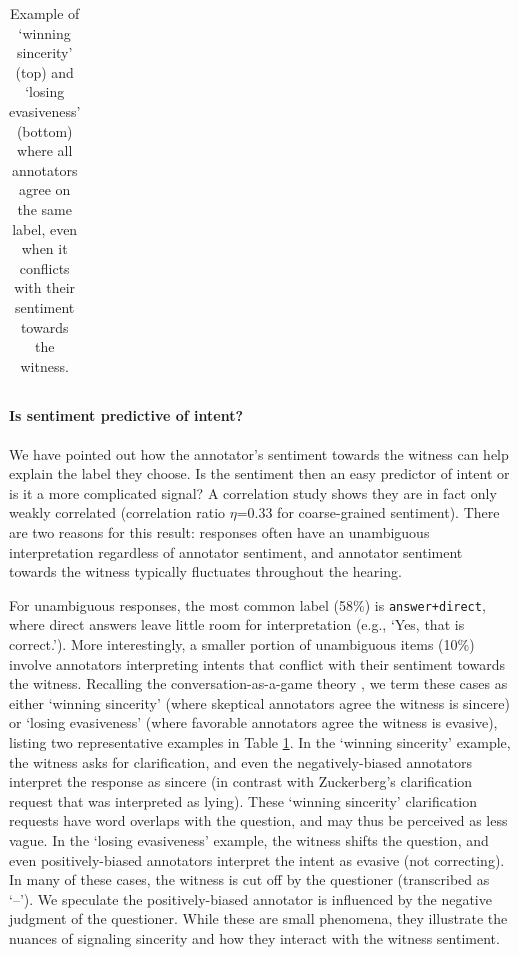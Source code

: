 \begin{table}[t]
\begin{tabular}{>{\raggedright\arraybackslash}p{5cm} >{\raggedright\arraybackslash}p{2.5cm} p{1.5cm} p{1cm}}
    \bottomrule
    \end{tabular}
    \vspace{-.4em}
    \caption{Example of `winning sincerity' (top) and `losing evasiveness' (bottom) where all annotators agree on the same label, even when it conflicts with their sentiment towards the witness.}
    \label{tab:subj_unambig_example}
\end{table}

\paragraph{Is sentiment predictive of intent?} We have pointed out how the annotator's sentiment towards the witness can help explain the label they choose. Is the sentiment then an easy predictor of intent or is it a more complicated signal? A correlation study shows they are in fact only weakly correlated (correlation ratio $\eta$=0.33 for coarse-grained sentiment).
There are two reasons for this result: responses  often have an unambiguous interpretation regardless of annotator sentiment, and annotator sentiment towards the witness typically fluctuates throughout the hearing.


For unambiguous responses, the most common label (58\%) is \texttt{answer+direct}, where direct answers leave little room for interpretation (e.g., `Yes, that is correct.'). More interestingly, a smaller portion of unambiguous items (10\%) involve annotators interpreting intents that conflict with their sentiment towards the witness. Recalling the conversation-as-a-game theory \cite{Asher:2003}, we term these cases as either `winning sincerity' (where skeptical annotators agree the witness is sincere) or `losing evasiveness' (where favorable annotators agree the witness is evasive), listing two representative examples in Table \ref{tab:subj_unambig_example}. In the `winning sincerity' example, the witness asks for clarification, and even the negatively-biased annotators interpret the response as sincere (in contrast with Zuckerberg's clarification request that was interpreted as lying). These `winning sincerity' clarification requests have word overlaps with the question, and may thus be perceived as less vague. In the `losing evasiveness' example, the witness shifts the question, and even positively-biased annotators interpret the intent as evasive (not correcting). In many of these cases, the witness is cut off by the questioner (transcribed as `--'). We speculate the positively-biased annotator is influenced by the negative judgment of the questioner. While these are small phenomena, they illustrate the nuances of signaling sincerity and how they interact with the witness sentiment.

